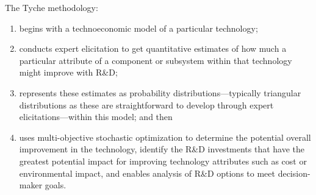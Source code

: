\documentclass[letterpaper,10pt,english]{sphinxmanual}
\begin{document}
The Tyche methodology:
\begin{enumerate}
\def\theenumi{\arabic{enumi}}
\def\labelenumi{\theenumi .}
\makeatletter\def\p@enumii{\p@enumi \theenumi .}\makeatother
\item {} 
begins with a technoeconomic model of a particular technology;

\item {} 
conducts expert elicitation to get quantitative estimates of how much a particular attribute of a component or subsystem within that technology might improve with R\&D;

\item {} 
represents these estimates as probability distributions—typically triangular distributions as these are straightforward to develop through expert elicitations—within this model; and then

\item {} 
uses multi-objective stochastic optimization to determine the potential overall improvement in the technology, identify the R\&D investments that have the greatest potential impact for improving technology attributes such as cost or environmental impact, and enables analysis of R\&D options to meet decision-maker goals.

\end{enumerate}
\end{document}
